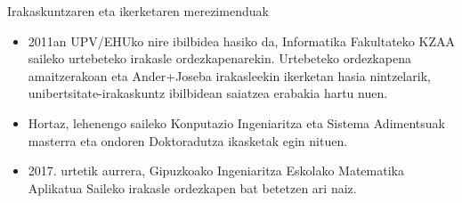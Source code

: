 \documentclass[
 10pt,%
 compress,%
 t,       %
 xcolor=svgnames
]{beamer}
\theoremstyle{definition} \newtheorem{definicion}{Definicion}[section]
\theoremstyle{propiedades} \newtheorem{propiedades}{Propiedades}[section]
\begin{document}
\begin{frame}{Irakaskuntzaren eta ikerketaren merezimenduak}
{\begin{itemize}
	\item 2011an UPV/EHUko nire ibilbidea hasiko da, Informatika Fakultateko KZAA saileko urtebeteko irakasle ordezkapenarekin. Urtebeteko ordezkapena amaitzerakoan eta Ander+Joseba irakasleekin ikerketan hasia nintzelarik,  unibertsitate-irakaskuntz ibilbidean saiatzea erabakia hartu nuen.
	
	
	\item Hortaz, lehenengo saileko Konputazio Ingeniaritza eta Sistema Adimentsuak masterra eta ondoren Doktoradutza ikasketak egin nituen.
	
	\item 2017. urtetik aurrera, Gipuzkoako Ingeniaritza Eskolako Matematika Aplikatua Saileko irakasle ordezkapen bat betetzen ari naiz.
	
	
\end{itemize}



}

\end{frame} 






%
%

%


\end{document}
